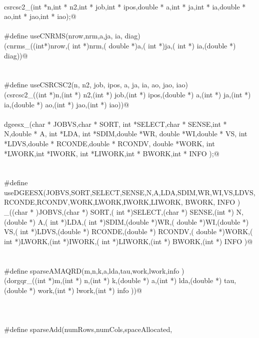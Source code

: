 \documentclass[12pt]{article}
\begin{document}
\begin{flushleft}
\begin{minipage}{\linewidth}
\begin{list}{}{}
\mbox{}\verb@@\\
\mbox{}\verb@int csrcsc2_(int *n,int * n2,int * job,int * ipos,double *  a,int *  ja,int * ia,double * ao,int *  jao,int *  iao);@\\
\mbox{}\verb@@\\
\mbox{}\verb@#define  useCNRMS(nrow,nrm,a,ja, ia, diag)\@\\
\mbox{}\verb@(cnrms_((int*)nrow,( int *)nrm,( double *)a,( int *)ja,( int *) ia,(double *) diag))@\\
\mbox{}\verb@@\\
\mbox{}\verb@@\\
\mbox{}\verb@#define  useCSRCSC2(n, n2, job, ipos,  a,  ja, ia, ao,  jao,  iao)\@\\
\mbox{}\verb@(csrcsc2_((int *)n,(int *) n2,(int *) job,(int *) ipos,(double *)  a,(int *)  ja,(int *) ia,(double *) ao,(int *)  jao,(int *)  iao))@\\
\mbox{}\verb@@\\
\mbox{}\verb@void dgeesx_(char * JOBVS,char * SORT, int *SELECT,char * SENSE,int * N,double * A, int *LDA, int *SDIM,double *WR, double *WI,double * VS, int *LDVS,double * RCONDE,double * RCONDV, double *WORK, int *LWORK,int *IWORK, int *LIWORK,int * BWORK,int * INFO );@\\
\mbox{}\verb@@\\
\mbox{}\verb@@\\
\mbox{}\verb@#define useDGEESX(JOBVS,SORT,SELECT,SENSE,N,A,LDA,SDIM,WR,WI,VS,LDVS,RCONDE,RCONDV,WORK,LWORK,IWORK,LIWORK, BWORK, INFO )\@\\
\mbox{}\verb@dgeesx_((char * )JOBVS,(char *) SORT,( int *)SELECT,(char *) SENSE,(int *) N,(double *) A,( int *)LDA,( int *)SDIM,(double *)WR,( double *)WI,(double *) VS,( int *)LDVS,(double *) RCONDE,(double *) RCONDV,( double *)WORK,( int *)LWORK,(int *)IWORK,( int *)LIWORK,(int *) BWORK,(int *) INFO )@\\
\mbox{}\verb@@\\
\mbox{}\verb@@\\
\mbox{}\verb@#define sparseAMAQRD(m,n,k,a,lda,tau,work,lwork,info )\@\\
\mbox{}\verb@(dorgqr_((int *)m,(int *) n,(int *) k,(double *) a,(int *) lda,(double *) tau,(double *) work,(int *) lwork,(int *) info ))@\\
\mbox{}\verb@@\\
\mbox{}\verb@@\\
\mbox{}\verb@@\\
\mbox{}\verb@#define sparseAdd(numRows,numCols,spaceAllocated, \@\\

\end{list}
\end{minipage}
\end{flushleft}
\end{document}
